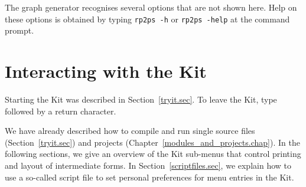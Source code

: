 \documentclass[12pt]{book}
\begin{document}
The graph generator recognises several options that are not shown
here. Help on these options is obtained by typing \texttt{rp2ps -h} or
%
{\tt rp2ps -help} at the command prompt.
%

\chapter{Interacting with the Kit}
\label{controlkit.sec}
\label{startup.sec}
Starting the Kit was described in Section~\ref{tryit.sec}.  To
%
%
%
leave the Kit, type  followed by a
return character. 

We have already described how to compile and run single source files
(Section~\ref{tryit.sec}) and projects
(Chapter~\ref{modules_and_projects.chap}).  In the following sections,
we give an overview of the Kit sub-menus that control printing and
layout of intermediate forms. In Section~\ref{scriptfiles.sec}, we
explain how to use a so-called script file to set personal preferences
for menu entries in the Kit.



\end{document}
